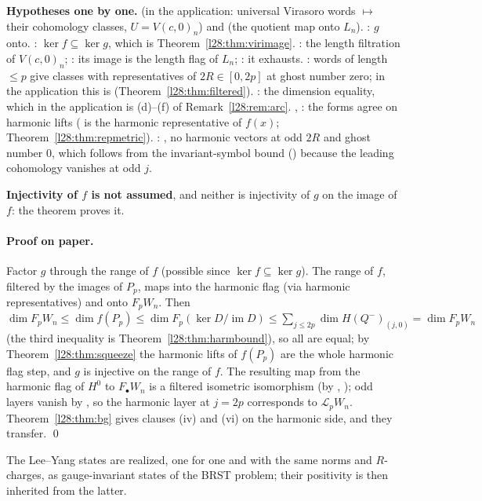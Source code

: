 \begin{dictionary}
\textbf{Hypotheses one by one.}  (in the application: universal Virasoro words $\mapsto$ their cohomology classes, $U=V(c,0)_n$) and
 (the quotient map onto $L_n$). : $g$ onto. : $\ker f\subseteq\ker g$, which is Theorem~\ref{l28:thm:virimage}.
: the length filtration of $V(c,0)_n$; : its image is the length flag of $L_n$; : it exhausts.
: words of length $\le p$ give classes with representatives of $2R\in[0,2p]$ at ghost number zero; in the application
this is  (Theorem~\ref{l28:thm:filtered}). : the dimension equality, which in the application is (d)--(f) of
Remark~\ref{l28:rem:arc}. , : the forms agree on harmonic lifts ( is the harmonic representative
of $f(x)$; Theorem~\ref{l28:thm:repmetric}). : , no harmonic vectors at odd $2R$ and ghost number
$0$, which follows from the invariant-symbol bound () because the leading cohomology vanishes at odd $j$.

\textbf{Injectivity of $f$ is not assumed}, and neither is injectivity of $g$ on the image of $f$: the theorem proves it.
\end{dictionary}

\paragraph{Proof on paper.} Factor $g$ through the range of $f$ (possible since $\ker f\subseteq\ker g$). The range of $f$, filtered by the images of
$P_p$, maps into the harmonic flag (via harmonic representatives) and onto $F_pW_n$. Then
$\dim F_pW_n\le\dim f(P_p)\le\dim F_p(\ker D/\operatorname{im}D)\le\sum_{j\le2p}\dim H(Q^-)_{(j,0)}=\dim F_pW_n$
(the third inequality is Theorem~\ref{l28:thm:harmbound}), so all are equal; by Theorem~\ref{l28:thm:squeeze} the harmonic lifts of $f(P_p)$ are the
whole harmonic flag step, and $g$ is injective on the range of $f$. The resulting map from the harmonic flag of $H^0$ to $F_\bullet W_n$ is a
filtered isometric isomorphism (by , ); odd layers vanish by , so the harmonic layer at $j=2p$ corresponds to
$\mathcal L_pW_n$. Theorem~\ref{l28:thm:bg} gives clauses (iv) and (vi) on the harmonic side, and they transfer. \qed

\begin{physics}
The Lee--Yang states are realized, one for one and with the same norms and $R$-charges, as gauge-invariant states of the BRST problem; their
positivity is then inherited from the latter.
\end{physics}

